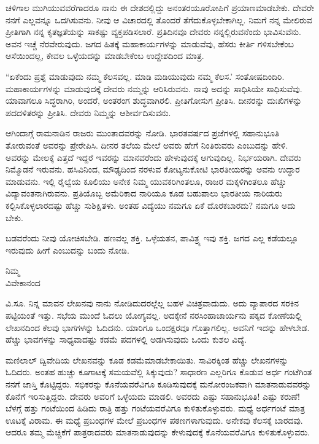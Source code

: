 ಚಳಿಗಾಲ ಮುಗಿಯುವವರೆಗಾದರೂ ನಾನು ಈ ದೇಶದಲ್ಲಿದ್ದು ಅನಂತರ\break ಯೂರೋಪಿಗೆ ಪ್ರಯಾಣಮಾಡಬೇಕು. ದೇವರೇ ನನಗೆ ಎಲ್ಲವನ್ನೂ ಒದಗಿಸುವನು. ನೀವು ಆ ವಿಚಾರದಲ್ಲಿ ತೊಂದರೆ ತೆಗೆದುಕೊಳ್ಳಬೇಕಾಗಿಲ್ಲ. ನಿಮಗೆ ನನ್ನ ಮೇಲಿರುವ ಪ್ರೀತಿಗಾಗಿ ನನ್ನ ಕೃತಜ್ಞತೆಯನ್ನು ಸಾಕಷ್ಟು ವ್ಯಕ್ತಪಡಿಸಲಾರೆ. ಪ್ರತಿದಿನವೂ ದೇವರು ನನ್ನಲ್ಲಿರುವನೆಂದು ಭಾವಿಸುವೆನು. ಅವನ ಇಚ್ಚೆ ನೆರವೇರುವುದು. ಜಗದ ಹಿತಕ್ಕೆ ಮಹಾಕಾರ್ಯಗಳನ್ನು ಮಾಡುವೆವು, ಹೆಸರು ಕೀರ್ತಿ ಗಳಿಸಬೇಕೆಂಬ ಆಸೆಯಿಂದಲ್ಲ, ಕೇವಲ ಒಳ್ಳೆಯದನ್ನು ಮಾಡಬೇಕೆಂಬ ಉದ್ದೇಶದಿಂದ ಮಾತ್ರ.

“ಏಕೆಂದು ಪ್ರಶ್ನೆ ಮಾಡುವುದು ನಮ್ಮ ಕೆಲಸವಲ್ಲ. ಮಾಡಿ ಮಡಿಯುವುದು ನಮ್ಮ ಕೆಲಸ.’ ಸಂತೋಷದಿಂದಿರಿ. ಮಹಾಕಾರ್ಯಗಳನ್ನು ಮಾಡುವುದಕ್ಕೆ ದೇವರು ನಮ್ಮನ್ನು ಆರಿಸಿರುವನು. ನಾವು ಅದನ್ನು ಸಾಧಿಸಿಯೇ ಸಾಧಿಸುವೆವು. ಯಾವಾಗಲೂ ಸಿದ್ಧರಾಗಿರಿ, ಅಂದರೆ, ಅಂತರಂಗ ಶುದ್ಧವಾಗಿರಲಿ. ಪ್ರೀತಿಗೋಸುಗ ಪ್ರೀತಿಸಿ. ದೀನರನ್ನು ದುಃಖಿಗಳನ್ನು ಪದದಳಿತರನ್ನು ಪ್ರೀತಿಸಿ. ದೇವರು ನಿಮ್ಮನ್ನು ಆಶೀರ್ವದಿಸುವನು.

ಆಗಿಂದಾಗ್ಗೆ ರಾಮನಾಡಿನ ರಾಜರು ಮುಂತಾದವರನ್ನು ನೋಡಿ. ಭಾರತವರ್ಷದ ಪ್ರಜೆಗಳಲ್ಲಿ ಸಹಾನುಭೂತಿ ತೋರುವಂತೆ ಅವರನ್ನು ಪ್ರೇರೇಪಿಸಿ. ದೀನರ ತಲೆಯ ಮೇಲೆ ಅವರು ಹೇಗೆ ನಿಂತಿರುವರು ಎಂಬುದನ್ನು ಹೇಳಿ. ಅವರನ್ನು ಮೇಲಕ್ಕೆ ಎತ್ತದೆ ಇದ್ದರೆ ಇವರನ್ನು ಮಾನವರೆಂದು ಹೇಳುವುದಕ್ಕೆ ಆಗುವುದಿಲ್ಲ. ನಿರ್ಭಯರಾಗಿ. ದೇವರು ನಿಮ್ಮೊಡನೆ ಇರುವನು. ಹಸಿವಿನಿಂದ, ಮೌಢ್ಯದಿಂದ ನರಳುವ ಕೋಟ್ಯನುಕೋಟಿ ಭಾರತೀಯರನ್ನು ಅವನು ಉದ್ಧಾರ ಮಾಡುವನು. ಇಲ್ಲಿ ರೈಲ್ವೆಯ ಕೂಲಿಯು ಅನೇಕ ನಿಮ್ಮ ಯುವಕರಿಗಿಂತಲೂ, ರಾಜರ ಮಕ್ಕಳಿಗಿಂತಲೂ ಹೆಚ್ಚು ವಿದ್ಯಾವಂತನಾಗಿರುವನು. ಪ್ರತಿಯೊಬ್ಬ ಅಮೆರಿಕಾದ ನಾರಿಯೂ ಕೂಡ ಬಹುಪಾಲು ಭಾರತೀಯ ನಾರಿಯರು ಕಲ್ಪಿಸಿಕೊಳ್ಳಲಾರದಷ್ಟು ಹೆಚ್ಚು ಸುಶಿಕ್ಷಿತಳು. ಅಂತಹ ವಿದ್ಯೆಯು ನಮಗೂ ಏಕೆ ದೊರಕಬಾರದು? ನಮಗೂ ಅದು ಬೇಕು.

ಬಡವರೆಂದು ನೀವು ಯೋಚಿಸಬೇಡಿ. ಹಣವಲ್ಲ ಶಕ್ತಿ. ಒಳ್ಳೆಯತನ, ಪಾವಿತ್ರ್ಯ ಇವು ಶಕ್ತಿ. ಜಗದ ಎಲ್ಲ ಕಡೆಯಲ್ಲೂ ಇರುವುದು ಹೀಗೆ ಎಂಬುದನ್ನು ಬಂದು ನೋಡಿ.

\vspace{-0.5cm}

{\flushright
ನಿಮ್ಮ\\ವಿವೇಕಾನಂದ\par}

ವಿ.ಸೂ. \enginline{-}ನಿನ್ನ ಮಾವನ ಲೇಖನವು ನಾನು ನೋಡಿದುದರಲ್ಲೆಲ್ಲ ಬಹಳ ವಿಚಿತ್ರ\break ವಾದುದು. ಅದು ವ್ಯಾಪಾರದ ಸರಕಿನ ಪಟ್ಟಿಯಂತೆ ಇತ್ತು. ಸಭೆಯ ಮುಂದೆ ಓದಲು ಯೋಗ್ಯವಲ್ಲ. ಅದಕ್ಕೇನೆ ನರಸಿಂಹಾಚಾರ್ಯನು ಪಕ್ಕದ ಕೋಣೆಯಲ್ಲಿ ಲೇಖನದಿಂದ ಕೆಲವು ಭಾಗಗಳನ್ನು ಓದಿದನು. ಯಾರಿಗೂ ಒಂದಕ್ಷರವೂ ಗೊತ್ತಾಗಲಿಲ್ಲ. ಅವನಿಗೆ ಇದನ್ನು ಹೇಳಬೇಡ. ಹೆಚ್ಚು ಭಾವಗಳನ್ನು ಸಾಧ್ಯವಾದಷ್ಟು ಕಡಮೆ ಪದಗಳಲ್ಲಿ ಅಡಗಿಸುವುದು ಒಂದು ಕುಶಲ ವಿದ್ಯೆ.

ಮಣಿಲಾಲ್ ದ್ವಿವೇದಿಯ ಲೇಖನವನ್ನು ಕೂಡ ಕಡಮೆಮಾಡಬೇಕಾಯಿತು. ಸಾವಿರ\break ಕ್ಕಿಂತ ಹೆಚ್ಚು ಲೇಖನಗಳನ್ನು ಓದಿದರು. ಅಂತಹ ಹುಚ್ಚು ಕೂಗಾಟಕ್ಕೆ ಸಮಯವೆಲ್ಲಿ ಸಿಕ್ಕುವುದು? ಸಾಧಾರಣ ಎಲ್ಲರಿಗೂ ಕೊಡುವ ಅರ್ಧ ಗಂಟೆಗಿಂತ ನನಗೆ ಜಾಸ್ತಿ ಕೊಟ್ಟಿದ್ದರು. ಸಭಿಕರನ್ನು ಕೊನೆಯವರೆವಿಗೂ ಕೂಡಿಸುವುದಕ್ಕೆ ಮನೋರಂಜಕವಾಗಿ ಮಾತನಾಡುವವರನ್ನು ಕೊನೆಗೆ ಇರಿಸುತ್ತಿದ್ದರು. ದೇವರು ಅವರಿಗೆ ಒಳ್ಳೆಯದು ಮಾಡಲಿ. ಅವರದು ಎಷ್ಟು ಸಹಾನುಭೂತಿ! ಎಷ್ಟು ಕರುಣೆ! ಬೆಳಗ್ಗೆ ಹತ್ತು ಗಂಟೆಯಿಂದ ಹಿಡಿದು ರಾತ್ರಿ ಹತ್ತು ಗಂಟೆಯವರೆವಿಗೂ ಕುಳಿತುಕೊಳ್ಳುವರು. ಮಧ್ಯೆ ಅರ್ಧಗಂಟೆ ಮಾತ್ರ ಊಟಕ್ಕೆ ವಿರಾಮ. ಈ ಮಧ್ಯೆ ಪ್ರಬಂಧಗಳ ಮೇಲೆ ಪ್ರಬಂಧಗಳ ಪಠಣಗಳಾಗುವುದು. ಅನೇಕವು ಕೆಲಸಕ್ಕೆ ಬಾರದವು. ಆದರೂ ತಮ್ಮ ಮೆಚ್ಚಿಕೆಗೆ ಪಾತ್ರರಾದವರು ಮಾತನಾಡುವುದನ್ನು ಕೇಳುವುದಕ್ಕೆ ಕೊನೆಯವರೆವಿಗೂ ಕುಳಿತುಕೊಳ್ಳುವರು.

